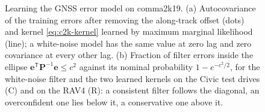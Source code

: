 \documentclass[graybox,envcountchap]{style/SNmono}
\begin{document}
\begin{figure}[!t]
{}
\caption{Learning the GNSS error model on comma2k19. (a) Autocovariance of the training errors after removing the along-track offset (dots) and kernel \eqref{eq:c2k-kernel} learned by maximum marginal likelihood (line); a white-noise model has the same value at zero lag and zero covariance at every other lag. (b) Fraction of filter errors inside the ellipse $\mathbf{e}^{\mathsf T}\mathbf{P}^{-1}\mathbf{e}\le c^{2}$ against its nominal probability $1-e^{-c^{2}/2}$, for the white-noise filter and the two learned kernels on the Civic test drives (C) and on the RAV4 (R): a consistent filter follows the diagonal, an overconfident one lies below it, a conservative one above it.}
\label{fig:c2k-learning}
\end{figure}
\end{document}
